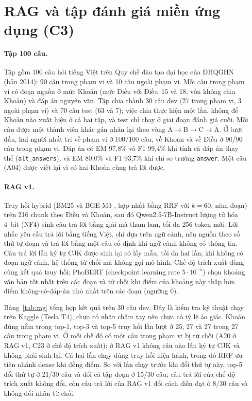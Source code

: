 \section{RAG và tập đánh giá miền ứng dụng (C3)}
\label{sec:rag}

\paragraph{Tập 100 câu.} Tập gồm 100 câu hỏi tiếng Việt trên Quy chế đào tạo đại học của ĐHQGHN (bản 2014): 90 câu trong phạm vi và 10 câu ngoài phạm vi. Mỗi câu trong phạm vi có đoạn nguồn ở mức Khoản (mức Điều với Điều~15 và 18, vốn không chia Khoản) và đáp án nguyên văn. Tập chia thành 30 câu dev (27 trong phạm vi, 3 ngoài phạm vi) và 70 câu test (63 và 7); việc chia thực hiện một lần, không để Khoản nào xuất hiện ở cả hai tập, và test chỉ chạy ở giai đoạn đánh giá cuối. Mỗi câu được một thành viên khác gán nhãn lại theo vòng A$\to$B$\to$C$\to$A. Ở lượt đầu, hai người nhất trí về phạm vi ở 100/100 câu, về Khoản và về Điều ở 90/90 câu trong phạm vi. Đáp án có EM 97,8\% và F1 99,4\% khi tính cả đáp án thay thế (\texttt{alt\_answers}), và EM 80,0\% và F1 93,7\% khi chỉ so trường \texttt{answer}. Một câu (A04) được viết lại vì có hai Khoản cùng trả lời được.

\paragraph{RAG v1.} Truy hồi hybrid (BM25 và BGE-M3 \citep{chen-etal-2024-m3}, hợp nhất bằng RRF \citep{cormack2009rrf} với $k=60$, năm đoạn) trên 216 chunk theo Điều và Khoản, sau đó Qwen2.5-7B-Instruct \citep{qwen2024qwen25} lượng tử hóa 4~bit (NF4) sinh câu trả lời bằng giải mã tham lam, tối đa 256 token mới. Lời nhắc yêu cầu trả lời bằng tiếng Việt, chỉ dựa trên ngữ cảnh, nêu nguồn theo số thứ tự đoạn và trả lời bằng một câu cố định khi ngữ cảnh không có thông tin. Câu trả lời lẫn ký tự CJK được sinh lại có lấy mẫu, tối đa hai lần; khi không có đoạn ngữ cảnh, hệ thống từ chối mà không gọi mô hình. Chế độ trích xuất dùng cùng kết quả truy hồi; PhoBERT (checkpoint learning rate $5\cdot10^{-5}$) chọn khoảng văn bản tốt nhất trên các đoạn và từ chối khi điểm của khoảng này thấp hơn điểm không-có-đáp-án nhỏ nhất trên các đoạn (ngưỡng 0).

Bảng~\ref{tab:rag} tổng hợp kết quả trên 30 câu dev. Đây là kiểm tra kỹ thuật chạy trên Kaggle (Tesla T4), chưa có nhãn chấm tay nên chưa có tỷ lệ ảo giác. Khoản đúng nằm trong top-1, top-3 và top-5 truy hồi lần lượt ở 25, 27 và 27 trong 27 câu trong phạm vi. Ở mỗi chế độ có một câu trong phạm vi bị từ chối (A20 ở RAG v1, C23 ở chế độ trích xuất); ở RAG v1 không câu nào lẫn ký tự CJK và không phải sinh lại. Cả hai lần chạy dùng truy hồi hiện hành, trong đó RRF ưu tiên nhánh dense khi đồng điểm. So với lần chạy trước khi đổi thứ tự này, top-5 đổi thứ tự ở 21/30 câu và đổi cả tập đoạn ở 15/30 câu; câu trả lời của chế độ trích xuất không đổi, còn câu trả lời của RAG v1 đổi cách diễn đạt ở 8/30 câu và không đổi nhãn từ chối.

